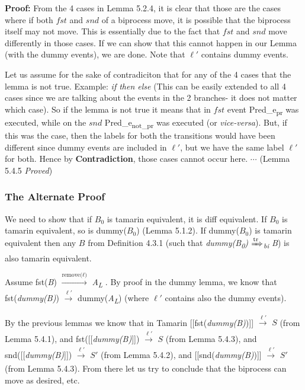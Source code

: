 \documentclass[11pt]{article}
\begin{document}
{\bf Proof:} From the 4 cases in Lemma 5.2.4, it is clear that those are the cases where if both $fst$ and $snd$ of a biprocess move, it is possible that the biprocess itself may not move. This is essentially due to the fact that $fst$ and $snd$ move differently in those cases. If we can show that this cannot happen in our Lemma (with the dummy events), we are done. Note that $\ell'$ contains dummy events.

Let us assume for the sake of contradiciton that for any of the 4 cases that the lemma is not true. Example: {\it if then else} (This can be easily extended to all 4 cases since we are talking about the events in the 2 branches- it does not matter which case). So if the lemma is not true it means that in $fst$ event Pred\_e\textsubscript{pr} was executed, while on the $snd$ Pred\_e\textsubscript{not\_pr} was executed (or {\it vice-versa}). But, if this was the case, then the labels for both the transitions would have been different since dummy events are included in $\ell'$, but we have the same label $\ell'$ for both. Hence by {\bf Contradiction}, those cases cannot occur here. \hfill \hfill $\cdots$ (Lemma 5.4.5 {\it Proved})


\subsubsection{The Alternate Proof}
We need to show that if $B_0$ is tamarin equivalent, it is diff equivalent. If $B_0$ is tamarin equivalent, so is dummy($B_0$) (Lemma 5.1.2). If dummy($B_0$) is tamarin equivalent then any $B$ from Definition 4.3.1 (such that {\it dummy(B\textsubscript{0}) {$\xRightarrow[\text{}]{\text{tr}}$}\textsubscript{bi} B}) is also tamarin equivalent. 

Assume fst({\it B}) {$\xrightarrow[\text{}]{\text{remove($\ell$)}}$} {\it A}\textsubscript{{\it L}} . By proof in the dummy lemma, we know that fst({\it dummy(B)}) {$\xrightarrow[\text{}]{\text{$\ell'$}}$} dummy({\it A}\textsubscript{{\it L}}) (where $\ell'$ contains also the dummy events). 

By the previous lemmas we know that in Tamarin [[fst({\it dummy(B)})]] {$\xrightarrow[\text{}]{\text{$\ell'$}}$} $S$ (from Lemma 5.4.1), and fst([[{\it dummy(B)}]]) {$\xrightarrow[\text{}]{\text{$\ell'$}}$} $S$ (from Lemma 5.4.3), and snd([[{\it dummy(B)}]]) {$\xrightarrow[\text{}]{\text{$\ell'$}}$} $S'$ (from Lemma 5.4.2), and [[snd({\it dummy(B)})]] {$\xrightarrow[\text{}]{\text{$\ell'$}}$} $S'$ (from Lemma 5.4.3). From there let us try to conclude that the biprocess can move as desired, etc.\newline
\end{document}
